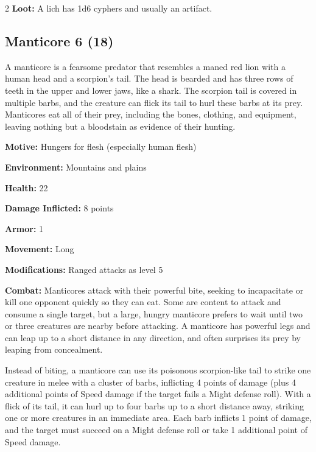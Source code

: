 \begin{multicols}{2}
\textbf{Loot:} A lich has 1d6 cyphers and usually an artifact.

\subsection{Manticore 6 (18)}

A manticore is a fearsome predator that resembles a maned red lion with a human head and a scorpion’s tail. The head is bearded and has three rows of teeth in the upper and lower jaws, like a shark. The scorpion tail is covered in multiple barbs, and the creature can flick its tail to hurl these barbs at its prey. Manticores eat all of their prey, including the bones, clothing, and equipment, leaving nothing but a bloodstain as evidence of their hunting. 

\textbf{Motive:} Hungers for flesh (especially human flesh) 

\textbf{Environment:} Mountains and plains 

\textbf{Health:} 22 

\textbf{Damage Inflicted:} 8 points 

\textbf{Armor:} 1 

\textbf{Movement:} Long 

\textbf{Modifications:} Ranged attacks as level 5 

\textbf{Combat:} Manticores attack with their powerful bite, seeking to incapacitate or kill one opponent quickly so they can eat. Some are content to attack and consume a single target, but a large, hungry manticore prefers to wait until two or three creatures are nearby before attacking. A manticore has powerful legs and can leap up to a short distance in any direction, and often surprises its prey by leaping from concealment. 

Instead of biting, a manticore can use its poisonous scorpion-like tail to strike one creature in melee with a cluster of barbs, inflicting 4 points of damage (plus 4 additional points of Speed damage if the target fails a Might defense roll). With a flick of its tail, it can hurl up to four barbs up to a short distance away, striking one or more creatures in an immediate area. Each barb inflicts 1 point of damage, and the target must succeed on a Might defense roll or take 1 additional point of Speed damage. 


\end{multicols}
